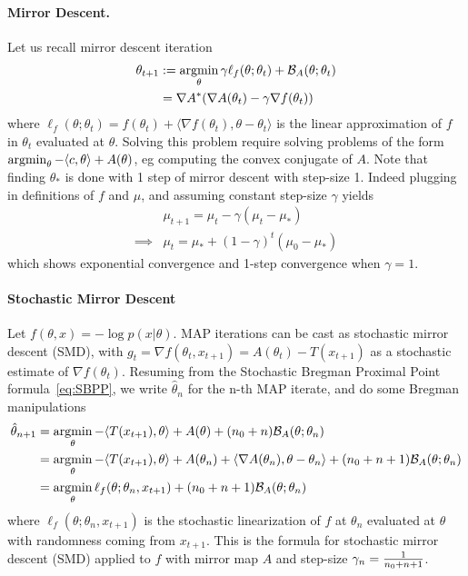 \documentclass{article}
\newcommand{\logpart}{A}
\newcommand{\conj}{\logpart^*}
\newcommand{\bregman}{\cB_\logpart}
\newcommand{\natp}{\theta}
\newcommand{\linear}{\ell} %
\newcommand{\lr}{\gamma} %
\newcommand{\MAPt}{\hat \natp_n}
\begin{document}
\paragraph{Mirror Descent.}
Let us recall mirror descent iteration
\begin{align}
	\natp_{t+1} 
	&:= \argmin_\natp \lr \linear_f(\natp; \natp_t) + \bregman(\natp ; \natp_t)  \\
	& = \nabla \conj (\nabla \logpart(\natp_t) - \lr \nabla f(\natp_t))
\end{align}
where $\linear_f(\natp; \natp_t) = f(\natp_t) + \langle \nabla f(\natp_t), \natp - \natp_t \rangle$ is the linear approximation of $f$ in $\natp_t$ evaluated at $\natp$. Solving this problem require solving problems of the form $\argmin_\natp - \langle c, \natp \rangle + \logpart(\natp)$, eg computing the convex conjugate of $\logpart$. 
Note that finding $\natp_*$ is done with 1 step of mirror descent with step-size 1.
Indeed plugging in definitions of $f$ and $\mu$, and assuming constant step-size $\lr$ yields
\begin{align}
	&\mu_{t+1}  = \mu_t - \lr (\mu_t - \mu_*) \\
	\implies &\mu_t  = \mu_* + (1- \lr)^t (\mu_0 - \mu_*)
\end{align}
which shows exponential convergence and 1-step convergence when $\lr =1$. 

\paragraph{Stochastic Mirror Descent}
Let $f(\natp, x) = -\log p(x|\natp)$.
MAP iterations can be cast as stochastic mirror descent (SMD),  with $g_t = \nabla f(\natp_t, x_{t+1}) = \logpart(\natp_t) - T(x_{t+1})$ as a stochastic estimate  of $\nabla f(\natp_t)$.
Resuming from the Stochastic Bregman Proximal Point formula~\eqref{eq:SBPP}, we write $\MAPt$ for the n-th MAP iterate, and do some Bregman manipulations
\begin{align}
    \hat \natp_{n+1}
    &= \argmin_\natp 
    - \langle T(x_{t+1}), \natp \rangle  + \logpart(\natp) + (n_0 + n) \bregman(\natp ; \natp_n) \\
    &= \argmin_\natp - \langle T(x_{t+1}), \natp \rangle   + \logpart(\natp_n) + \langle \nabla \logpart(\natp_n)  , \natp - \natp_n \rangle + (n_0+n + 1) \bregman(\natp ; \natp_n) \\
    &= \argmin_\natp \linear_f(\natp;\natp_n, x_{t+1}) + (n_0 + n + 1) \bregman(\natp ; \natp_n)
\end{align}
where $\linear_f(\natp;\natp_n, x_{t+1})$ is the stochastic linearization of $f$ at $\natp_n$ evaluated at $\natp$ with randomness coming from $x_{t+1}$. This is the formula for stochastic mirror descent (SMD) applied to $f$ with mirror map $\logpart$ and step-size $\gamma_n = \frac{1}{n_0 + n + 1}$.
\end{document}

